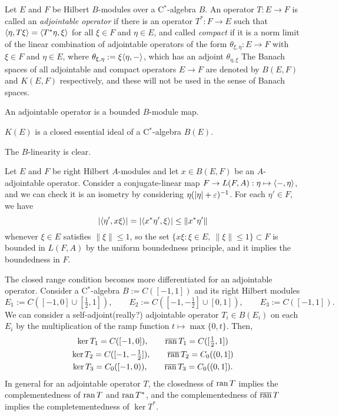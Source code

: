\documentclass{../../large}
\begin{document}
\begin{prb}
Let $E$ and $F$ be Hilbert $B$-modules over a C$^*$-algebra $B$.
An operator $T:E\to F$ is called an \emph{adjointable operator} if there is an operator $T^*:F\to E$ such that $\langle\eta,T\xi\rangle=\langle T^*\eta,\xi\rangle$ for all $\xi\in F$ and $\eta\in E$, and called \emph{compact} if it is a norm limit of the linear combination of adjointable operators of the form $\theta_{\xi,\eta}:E\to F$ with $\xi\in F$ and $\eta\in E$, where $\theta_{\xi,\eta}:=\xi\langle\eta,-\rangle$, which has an adjoint $\theta_{\eta,\xi}$
The Banach spaces of all adjointable and compact operators $E\to F$ are denoted by $B(E,F)$ and $K(E,F)$ respectively, and these will not be used in the sense of Banach spaces.
\begin{parts}
\item An adjointable operator is a bounded $B$-module map.
\item $K(E)$ is a closed essential ideal of a C$^*$-algebra $B(E)$.
\item
\end{parts}
\end{prb}
\begin{pf}
The $B$-linearity is clear.

Let $E$ and $F$ be right Hilbert $A$-modules and let $x\in B(E,F)$ be an $A$-adjointable operator.
Consider a conjugate-linear map $F\to L(F,A):\eta\mapsto\langle-,\eta\rangle$, and we can check it is an isometry by considering $\eta(|\eta|+\varepsilon)^{-1}$.
For each $\eta'\in F$, we have
\[|\langle\eta',x\xi\rangle|=|\langle x^*\eta',\xi\rangle|\le\|x^*\eta'\|\]
whenever $\xi\in E$ satisfies $\|\xi\|\le1$, so the set $\{x\xi:\xi\in E,\ \|\xi\|\le1\}\subset F$ is bounded in $L(F,A)$ by the uniform boundedness principle, and it implies the boundedness in $F$.

\end{pf}

The closed range condition becomes more differentiated for an adjointable operator.
Consider a C$^*$-algebra $B:=C([-1,1])$ and its right Hilbert modules
\[E_1:=C([-1,0]\cup[\tfrac12,1]),\qquad E_2:=C([-1,-\tfrac12]\cup[0,1]),\qquad E_3:=C([-1,1]).\]
We can consider a self-adjoint(really?) adjointable operator $T_i\in B(E_i)$ on each $E_i$ by the multiplication of the ramp function $t\mapsto\max\{0,t\}$.
Then,
\begin{gather*}
\ker T_1=C([-1,0]),\qquad\overline{\operatorname{ran}}\,T_1=C([\tfrac12,1])\\
\ker T_2=C([-1,-\tfrac12]),\qquad\overline{\operatorname{ran}}\,T_2=C_0((0,1])\\
\ker T_3=C_0([-1,0)),\qquad\overline{\operatorname{ran}}\,T_3=C_0((0,1]).
\end{gather*}
In general for an adjointable operator $T$, the closedness of $\operatorname{ran} T$ implies the complementedness of $\operatorname{ran} T$ and $\operatorname{ran} T^*$, and the complementedness of $\overline{\operatorname{ran}}\,T$ implies the completementedness of $\ker T^*$.
\end{document}
